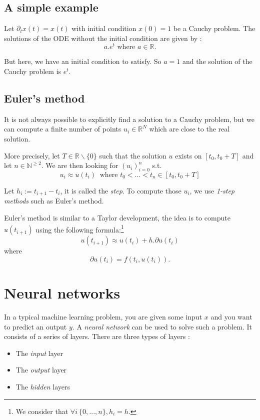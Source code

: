 \documentclass[10pt,a4paper]{article}
\theoremstyle{definition}
\theoremstyle{definition}
\begin{document}
\subsection{A simple example}
Let $\partial_t x(t) = x(t)$ with initial condition $x(0) = 1$ be a Cauchy problem. The solutions of the ODE without the initial condition are given by : 
$$
a . e^t \text{ where } a\in \mathbb{R}.
$$

But here, we have an initial condition to satisfy. So $a = 1$ and the solution of the Cauchy problem is $e^t$.


\subsection{Euler's method}
It is not always possible to explicitly find a solution to a Cauchy problem, but we can compute a finite number of points $u_i \in \mathbb{R}^N$ which are close to the real solution. 

More precisely, let $T \in \mathbb{R}\backslash\{0\}$ such that the solution $u$ exists on $[t_0, t_0 + T]$ and let $n \in \mathbb{N}^{\geqslant 2}$. We are then looking for $(u_i)^n_{i=0}$ s.t. 
\[
u_i \approx u(t_i) \ \text{ where } t_0 < ... < t_n \in [t_0, t_0 + T]
\]

Let $h_i := t_{i+1} - t_i$, it is called the \textit{step}. To compute those $u_i$, we use \textit{1-step methods} such as Euler's method.

Euler's method is similar to a Taylor development, the idea is to compute $u(t_{i+1})$ using the following formula:\footnote{We consider that $ \forall i\ \{0,...,n\}, h_i = h$.}
\[
u(t_{i+1}) \approx u(t_i) + h . \partial u(t_i)
\]
where 
\[
\partial u(t_i) = f(t_i, u(t_i)).
\]

\section{Neural networks}

In a typical machine learning problem, you are given some input $x$ and you want to predict an output $y$. A \textit{neural network} can be used to solve such a problem. It consists of a series of layers. There are three types of layers :

\begin{itemize}
\item The \textit{input} layer
\item The \textit{output} layer
\item The \textit{hidden} layers
\end{itemize}
\end{document}
